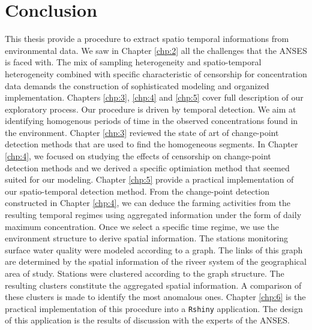 

\chapter{Conclusion}

This thesis provide a procedure to extract spatio temporal informations from environmental data. 
We saw in Chapter \ref{chp:2} all the challenges that the ANSES is faced with. The mix of sampling heterogeneity and spatio-temporal heterogeneity combined with specific characteristic of censorship for concentration data demands the construction of sophisticated modeling and organized implementation. Chapters \ref{chp:3}, \ref{chp:4} and \ref{chp:5} cover full description of our exploratory process.     
Our procedure is driven by temporal detection. We aim at identifying homogenous periods of time in the observed concentrations found in the environment. Chapter \ref{chp:3} reviewed the state of art of change-point detection methods that are used to find the homogeneous segments. In Chapter \ref{chp:4}, we focused on studying the effects of censorship on change-point detection methods and we derived a specific optimiation method that seemed suited for our modeling. 
Chapter \ref{chp:5} provide a practical implementation of our spatio-temporal detection method. From the change-point detection constructed in Chapter \ref{chp:4}, we can deduce the farming activities from the resulting temporal regimes using aggregated information under the form of daily maximum concentration. Once we select a specific time regime, we use the environment structure to derive spatial information. The stations monitoring surface water quality were modeled according to a graph. The links of this graph are determined by the spatial information of the riveer system of the geographical area of study. Stations were clustered according to the graph structure. The resulting clusters constitute the aggregated spatial information. A comparison of these clusters is made to identify the most anomalous ones. 
Chapter \ref{chp:6} is the practical implementation of this procedure into a \texttt{Rshiny} application. The design of this application is the results of discussion with the experts of the ANSES.  

